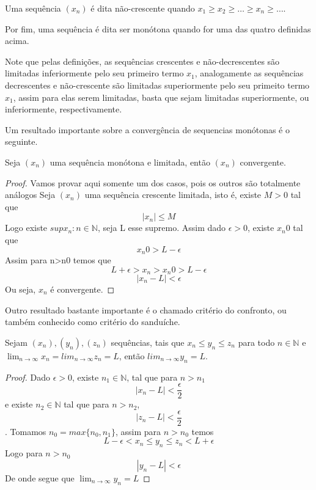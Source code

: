 Uma sequência $(x_n)$ é dita não-crescente quando $x_1 \geq x_2 \geq \dots 
\geq x_n \geq \dots$.

Por fim, uma sequência é dita ser monótona quando for uma das quatro definidas 
acima.

Note que pelas definições, as sequências crescentes e não-decrescentes são 
limitadas inferiormente pelo seu primeiro termo $x_1$, analogamente as sequências
decrescentes e não-crescente são limitadas superiormente pelo seu primeito termo 
$x_1$, assim para elas serem limitadas, basta que sejam limitadas superiormente,
ou inferiormente, respectivamente.

Um resultado importante sobre a convergência de sequencias monótonas é o seguinte.

\begin{teo}\label{monótona}
    Seja $(x_n)$ uma sequência monótona e limitada, então $(x_n)$ convergente.
\end{teo}

\begin{proof}
    Vamos provar aqui somente um dos casos, pois os outros são totalmente análogos
    Seja $(x_n)$ uma sequência crescente limitada, isto é, existe $M>0$ tal que
    $$|x_n| \leq M $$ 
    Logo existe $sup{x_n: n \in \mathbb{N}}$, seja L esse supremo.
    Assim dado $\epsilon > 0$, existe $x_n0$ tal que
    $$ x_n0 > L - \epsilon $$
    Assim para n>n0 temos que
    $$L + \epsilon > x_n > x_n0 > L - \epsilon$$
    $$|x_n - L| < \epsilon $$
    Ou seja, $x_n$ é convergente.
\end{proof}

Outro resultado bastante importante é o chamado critério do confronto, ou também 
conhecido como critério do sanduíche.

\begin{teo}
    Sejam $(x_n),(y_n),(z_n)$ sequências, tais que $x_n \leq y_n \leq z_n$ para todo 
    $n \in \mathbb{N}$ e $\lim_{n \to \infty} x_n = lim_{n \to \infty} z_n = L$,
    então $lim_{n \to \infty} y_n = L$.
\end{teo}

\begin{proof}
    Dado $\epsilon > 0$, existe $n_1 \in \mathbb{N}$, tal que para $n>n_1$
    $$|x_n - L| < \frac{\epsilon}{2}$$
    e existe $n_2 \in \mathbb{N}$ tal que para $n>n_2$,
    $$|z_n - L| < \frac{\epsilon}{2} $$.
    Tomamos $n_0 = max\{n_0,n_1 \}$, assim para $n > n_0$ temos
    $$L - \epsilon < x_n \leq y_n \leq z_n < L + \epsilon$$
    Logo para $n > n_0$
    $$ |y_n - L| < \epsilon$$
    De onde segue que $\lim_{n \to \infty} y_n = L$
\end{proof}

